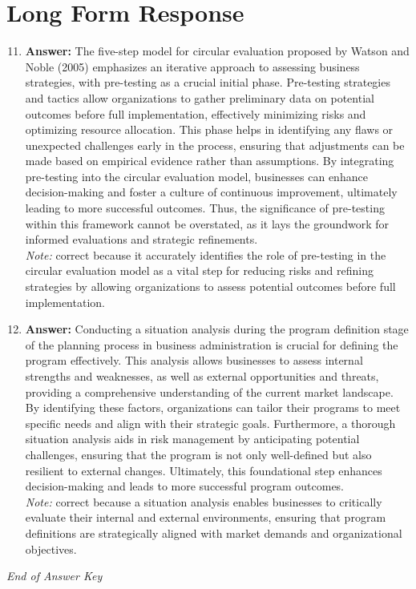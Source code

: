 \documentclass[12pt]{article}
\begin{document}
\section*{Long Form Response}
\begin{enumerate}[label=\arabic*.]
\setcounter{enumi}{10}
\item \textbf{Answer:} The five-step model for circular evaluation proposed by Watson and Noble (2005) emphasizes an iterative approach to assessing business strategies, with pre-testing as a crucial initial phase. Pre-testing strategies and tactics allow organizations to gather preliminary data on potential outcomes before full implementation, effectively minimizing risks and optimizing resource allocation. This phase helps in identifying any flaws or unexpected challenges early in the process, ensuring that adjustments can be made based on empirical evidence rather than assumptions. By integrating pre-testing into the circular evaluation model, businesses can enhance decision-making and foster a culture of continuous improvement, ultimately leading to more successful outcomes. Thus, the significance of pre-testing within this framework cannot be overstated, as it lays the groundwork for informed evaluations and strategic refinements.
\\ \textit{Note:} correct because it accurately identifies the role of pre-testing in the circular evaluation model as a vital step for reducing risks and refining strategies by allowing organizations to assess potential outcomes before full implementation.
\item \textbf{Answer:} Conducting a situation analysis during the program definition stage of the planning process in business administration is crucial for defining the program effectively. This analysis allows businesses to assess internal strengths and weaknesses, as well as external opportunities and threats, providing a comprehensive understanding of the current market landscape. By identifying these factors, organizations can tailor their programs to meet specific needs and align with their strategic goals. Furthermore, a thorough situation analysis aids in risk management by anticipating potential challenges, ensuring that the program is not only well-defined but also resilient to external changes. Ultimately, this foundational step enhances decision-making and leads to more successful program outcomes.
\\ \textit{Note:} correct because a situation analysis enables businesses to critically evaluate their internal and external environments, ensuring that program definitions are strategically aligned with market demands and organizational objectives.
\end{enumerate}

\vfill
\noindent\textit{End of Answer Key}
\end{document}
